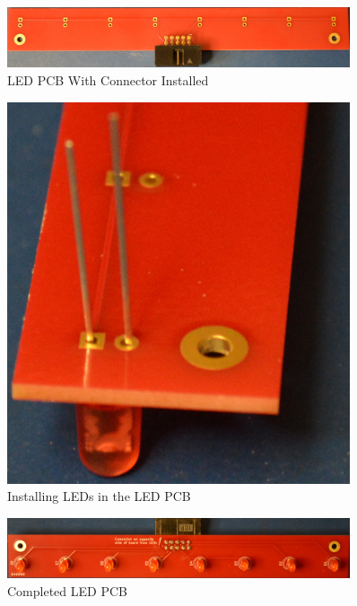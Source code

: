 \documentclass[10pt, openany]{book}
\begin{document}
\begin{figure}[ht!]
  \centering
  \includegraphics[width=0.9\textwidth]{../Pict/LED-Connector.jpg}
  \caption{LED PCB With Connector Installed}
  \label{fig:LEDConnector}
\end{figure}

\begin{figure}[ht!]
  \centering
  \includegraphics[width=0.9\textwidth]{../Pict/LED-LED.jpg}
  \caption{Installing LEDs in the LED PCB}
  \label{fig:LEDLED}
\end{figure}

\begin{figure}[ht!]
  \centering
  \includegraphics[width=0.9\textwidth]{../Pict/LED-Final.jpg}
  \caption{Completed LED PCB}
  \label{fig:LEDFinal}
\end{figure}
\end{document}

